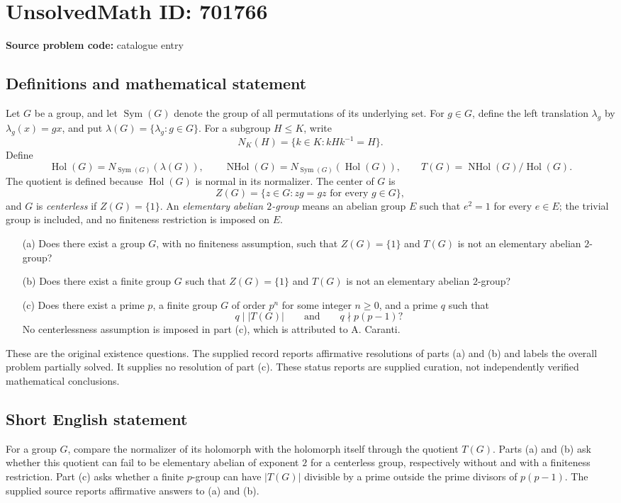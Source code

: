 \documentclass[11pt]{article}
\begin{document}
\section*{UnsolvedMath ID: 701766}
\textbf{Source problem code:} catalogue entry
\subsection{Definitions and mathematical statement}
Let \(G\) be a group, and let \(\operatorname{Sym}(G)\) denote the group of all permutations of its underlying set. For \(g\in G\), define the left translation \(\lambda_g\) by \(\lambda_g(x)=gx\), and put \(\lambda(G)=\{\lambda_g:g\in G\}\). For a subgroup \(H\leq K\), write
\[
N_K(H)=\{k\in K:kHk^{-1}=H\}.
\]
Define
\[
\operatorname{Hol}(G)=N_{\operatorname{Sym}(G)}(\lambda(G)),\qquad
\operatorname{NHol}(G)=N_{\operatorname{Sym}(G)}(\operatorname{Hol}(G)),\qquad
T(G)=\operatorname{NHol}(G)/\operatorname{Hol}(G).
\]
The quotient is defined because \(\operatorname{Hol}(G)\) is normal in its normalizer. The center of \(G\) is
\[
Z(G)=\{z\in G:zg=gz\text{ for every }g\in G\},
\]
and \(G\) is \emph{centerless} if \(Z(G)=\{1\}\). An \emph{elementary abelian \(2\)-group} means an abelian group \(E\) such that \(e^2=1\) for every \(e\in E\); the trivial group is included, and no finiteness restriction is imposed on \(E\).

\begin{enumerate}
\item[(a)] Does there exist a group \(G\), with no finiteness assumption, such that \(Z(G)=\{1\}\) and \(T(G)\) is not an elementary abelian \(2\)-group?
\item[(b)] Does there exist a finite group \(G\) such that \(Z(G)=\{1\}\) and \(T(G)\) is not an elementary abelian \(2\)-group?
\item[(c)] Does there exist a prime \(p\), a finite group \(G\) of order \(p^n\) for some integer \(n\geq 0\), and a prime \(q\) such that
\[
q\mid |T(G)|\qquad\text{and}\qquad q\nmid p(p-1)?
\]
No centerlessness assumption is imposed in part (c), which is attributed to A. Caranti.
\end{enumerate}

These are the original existence questions. The supplied record reports affirmative resolutions of parts (a) and (b) and labels the overall problem partially solved. It supplies no resolution of part (c). These status reports are supplied curation, not independently verified mathematical conclusions.
\subsection{Short English statement}
For a group \(G\), compare the normalizer of its holomorph with the holomorph itself through the quotient \(T(G)\). Parts (a) and (b) ask whether this quotient can fail to be elementary abelian of exponent \(2\) for a centerless group, respectively without and with a finiteness restriction. Part (c) asks whether a finite \(p\)-group can have \(|T(G)|\) divisible by a prime outside the prime divisors of \(p(p-1)\). The supplied source reports affirmative answers to (a) and (b).
\end{document}
